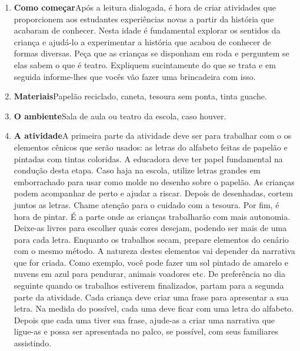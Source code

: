 \documentclass[11pt]{extarticle}
\begin{document}

\begin{enumerate}
\item \textbf{Como começar}\quad Após a leitura dialogada, é hora de criar 
atividades que proporcionem aos estudantes experiências novas a partir da história 
que acabaram de conhecer. Nesta idade é fundamental explorar os sentidos da criança e 
ajudá-lo a experimentar a história que acabou de conhecer de formas diversas. 
Peça que as crianças se disponham em roda e perguntem se elas sabem o que é teatro.
Expliquem sucintamente do que se trata e em seguida informe-lhes que vocês vão
fazer uma brincadeira com isso.

\item \textbf{Materiais}\quad Papelão reciclado, caneta, tesoura sem ponta, tinta guache.
\item \textbf{O ambiente}\quad Sala de aula ou teatro da escola, caso houver.

\item \textbf{A atividade}\quad A primeira parte da atividade deve ser para
trabalhar com o os elementos cênicos que serão usados: as letras do alfabeto
feitas de papelão e pintadas com tintas coloridas. 
A educadora deve ter papel fundamental na condução desta etapa. 
Caso haja na escola, utilize letras grandes em emborrachado para usar
como molde no desenho sobre o papelão. 
As crianças podem acompanhar de perto e ajudar a riscar.
Depois de desenhadas, cortem juntos as letras. Chame atenção para o cuidado com 
a tesoura. 
Por fim, é hora de pintar. É a parte onde as crianças trabalharão com mais autonomia.
Deixe-as livres para escolher quais cores desejam, podendo ser mais de uma para
cada letra. 
Enquanto os trabalhos secam, prepare elementos do cenário com o mesmo método.
A natureza destes elementos vai depender da narrativa que for criada. 
Como exemplo, você pode fazer um sol pintado de amarelo e nuvens em azul para pendurar,
animais voadores etc. 
De preferência no dia seguinte quando os trabalhos estiverem finalizados, partam para a 
segunda parte da atividade. 
Cada criança deve criar uma frase para apresentar a sua letra. 
Na medida do possível, cada uma deve ficar com uma letra do alfabeto. 
Depois que cada uma tiver sua frase, ajude-as a criar uma narrativa que ligue-as
e possa ser apresentada no palco, se possível, com seus familiares assistindo. 



\end{enumerate}
\end{document}
